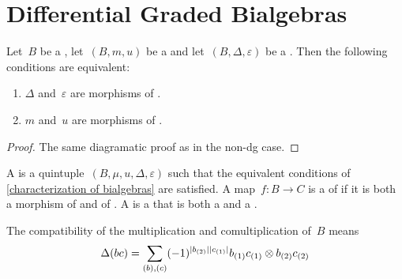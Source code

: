 \documentclass[a4paper,10pt,headings=standardclasses]{scrartcl}
\begin{document}
\section{Differential Graded Bialgebras}

\begin{lemma}
  \label{characterization of bialgebras}
  Let~$B$ be a {\dgv}, let~$(B, m, u)$ be a {\dga} and let~$(B, \Delta, \varepsilon)$ be a {\dgc}.
  Then the following conditions are equivalent:
  \begin{enumerate}
    \item
      $\Delta$ and~$\varepsilon$ are morphisms of {\dgas}.
    \item
      $m$ and~$u$ are morphisms of {\dgcs}.
  \end{enumerate}
\end{lemma}

\begin{proof}
  The same diagramatic proof as in the non-dg case.
\end{proof}

\begin{definition}
  A  is a quintuple~$(B, \mu, u, \Delta, \varepsilon)$ such that the equivalent conditions of \cref{characterization of bialgebras} are satisfied.
  A map~$f \colon B \to C$ is a  of {\dgbs} if it is both a morphism of {\dgas} and of {\dgcs}.
  A  is a {\dgsub} that is both a {\dgi} and a {\dgci}.
\end{definition}

\begin{remark}
  The compatibility of the multiplication and comultiplication of~$B$ means
  \begin{gather*}
    \Delta(bc)
    =
    \sum_{(b), (c)}
    (-1)^{\lvert b_{(2)}\rvert \lvert c_{(1)}\rvert}
    b_{(1)} c_{(1)} \otimes b_{(2)} c_{(2)}
  \end{gather*}

\end{remark}
\end{document}
